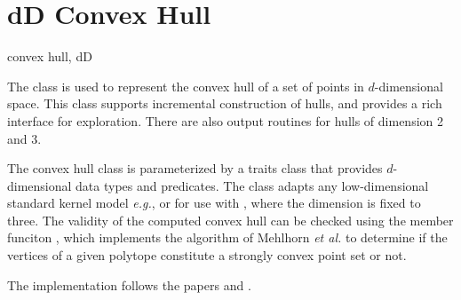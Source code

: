 \section{dD Convex Hull}
\begin{ccPackage}{convex hull, dD}
  
The class  is used to represent the
convex hull of a set of points in $d$-dimensional space.  This class
supports incremental construction of hulls, and provides a rich
interface for exploration. There are also output routines for hulls
of dimension 2 and 3.

The convex hull class is parameterized by a traits class that provides 
$d$-dimensional data types and predicates.  The class 
 adapts any low-dimensional standard kernel 
model \textit{e.g.},  or  for use 
with , where the dimension is fixed to three.
The validity of the computed convex hull can be checked using the
member funciton , which implements the algorithm
of Mehlhorn \textit{et al.}\cite{mnssssu-cgpvg-96} to determine if
the vertices of a given polytope constitute a strongly convex point
set or not.
  
The implementation follows the papers \cite{cms-frric-93} and
\cite{bms-dgc-94}.  

\end{ccPackage}


